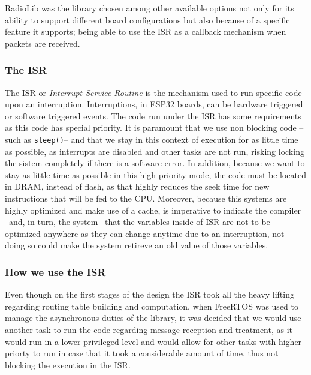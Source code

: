 RadioLib was the library chosen among other available options not only for its ability to support different board configurations but also because of a specific feature it supports; being able to use the ISR as a callback mechanism when packets are received.
\subsubsection{The ISR}
\label{ssec:ISR}
The ISR or \textit{Interrupt Service Routine} is the mechanism used to run specific code upon an interruption. Interruptions, in ESP32 boards, can be hardware triggered or software triggered events.
The code run under the ISR has some requirements as this code has special priority. It is paramount that we use non blocking code --such as \texttt{sleep()}-- and that we stay in this context of execution for as little time as possible, as interrupts are disabled and other tasks are not run, risking locking the sistem completely if there is a software error. In addition, because we want to stay as little time as possible in this high priority mode, the code must be located in DRAM, instead of flash, as that highly reduces the seek time for new instructions that will be fed to the CPU. Moreover, because this systems are highly optimized and make use of a cache, is imperative to indicate the compiler --and, in turn, the system-- that the variables inside of ISR are not to be optimized anywhere as they can change anytime due to an interruption, not doing so could make the system retireve an old value of those variables.
\subsubsection{How we use the ISR}
Even though on the first stages of the design the ISR took all the heavy lifting regarding routing table building and computation, when FreeRTOS was used to manage the asynchronous duties of the library, it was decided that we would use another task to run the code regarding message reception and treatment, as it would run in a lower privileged level and would allow for other tasks with higher priorty to run in case that it took a considerable amount of time, thus not blocking the execution in the ISR.
